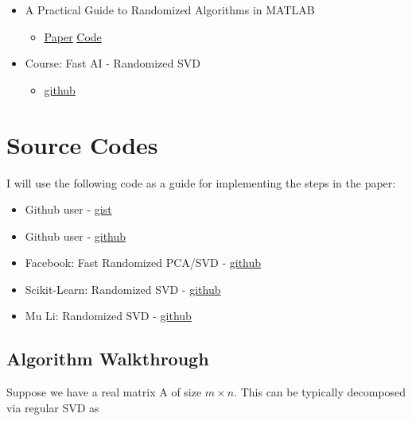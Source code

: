 \documentclass[11pt]{article}
\providecommand{\tightlist}{%
      \setlength{\itemsep}{0pt}\setlength{\parskip}{0pt}}
\begin{document}
\begin{itemize}
\tightlist
\item
  A Practical Guide to Randomized Algorithms in MATLAB

  \begin{itemize}
  \tightlist
  \item
    \href{https://arxiv.org/pdf/1505.07570.pdf}{Paper} \textbar{}
    \href{https://github.com/wangshusen/RandMatrixMatlab}{Code}
  \end{itemize}
\item
  Course: Fast AI - Randomized SVD

  \begin{itemize}
  \tightlist
  \item
    \href{https://github.com/fastai/randomized-SVD}{github}
  \end{itemize}
\end{itemize}

\hypertarget{source-codes}{%
\section{Source Codes}\label{source-codes}}

I will use the following code as a guide for implementing the steps in
the paper:

\begin{itemize}
\tightlist
\item
  Github user - \href{https://gist.github.com/alextp/662433}{gist}
\item
  Github user - \href{https://github.com/ktaneishi/pyredsvd}{github}
\item
  Facebook: Fast Randomized PCA/SVD -
  \href{https://github.com/facebook/fbpca/blob/master/fbpca.py}{github}
\item
  Scikit-Learn: Randomized SVD -
  \href{https://github.com/scikit-learn/scikit-learn/blob/51a765acfa4c5d1ec05fc4b406968ad233c75162/sklearn/utils/extmath.py}{github}
\item
  Mu Li: Randomized SVD -
  \href{https://github.com/mli/nystrom/blob/master/rsvd.m}{github}
\end{itemize}

    \hypertarget{algorithm-walkthrough}{%
\subsection{Algorithm Walkthrough}\label{algorithm-walkthrough}}

    Suppose we have a real matrix A of size \(m\times n\). This can be
typically decomposed via regular SVD as
\end{document}
